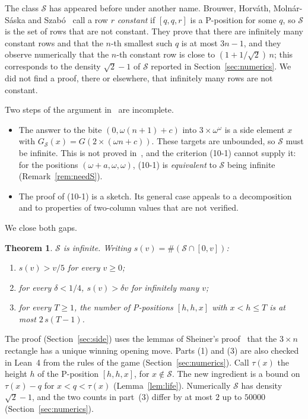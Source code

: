\documentclass[11pt]{amsart}
\newtheorem{theorem}{Theorem}
\theoremstyle{definition}
\theoremstyle{remark}
\newcommand{\Sc}{\mathcal{S}}
\newcommand{\G}{G}
\newcommand{\GS}{G_{\Sc}}
\begin{document}
The class $\Sc$ has appeared before under another name. Brouwer, Horv\'ath, Moln\'ar-S\'aska
and Szab\'o~\cite[\S8.5--8.8]{BHMS} call a row $r$ \emph{constant} if $[q,q,r]$ is a P-position
for some $q$, so $\Sc$ is the set of rows that are not constant. They prove that there are
infinitely many constant rows and that the $n$-th smallest such $q$ is at most $3n-1$, and
they observe numerically that the $n$-th constant row is close to $(1+1/\sqrt2)\,n$; this
corresponds to the density $\sqrt2-1$ of $\Sc$ reported in Section~\ref{sec:numerics}. We did
not find a proof, there or elsewhere, that infinitely many rows are not constant.

Two steps of the argument in~\cite{HS} are incomplete.
\begin{itemize}
\item The answer to the bite $(0,\omega(n+1)+c)$ into $3\times\omega^\omega$ is a side element
  $x$ with $\GS(x)=\G(2\times(\omega n+c))$. These targets are unbounded, so $\Sc$ must be
  infinite. This is not proved in~\cite{HS}, and the criterion (10-1) cannot supply it: for the
  positions $(\omega+a,\omega,\omega)$, (10-1) is \emph{equivalent} to $\Sc$ being infinite
  (Remark~\ref{rem:needS}).
\item The proof of (10-1) is a sketch. Its general case appeals to a decomposition and to
  properties of two-column values that are not verified.
\end{itemize}

We close both gaps.

\begin{theorem}\label{thm:side}
$\Sc$ is infinite. Writing $s(v)=\#(\Sc\cap[0,v])$:
\begin{enumerate}
\item $s(v)>v/5$ for every $v\ge0$;
\item for every $\delta<1/4$, $s(v)>\delta v$ for infinitely many $v$;
\item for every $T\ge1$, the number of P-positions $[h,h,x]$ with $x<h\le T$ is at most
  $2\,s(T-1)$.
\end{enumerate}
\end{theorem}

The proof (Section~\ref{sec:side}) uses the lemmas of Sheiner's proof~\cite{Sh} that the
$3\times n$ rectangle has a unique winning opening move. Parts (1) and (3) are also checked in
Lean~4 from the rules of the game (Section~\ref{sec:numerics}). Call $\tau(x)$ the height $h$ of the
P-position $[h,h,x]$, for $x\notin\Sc$. The new ingredient is a bound on $\tau(x)-q$ for
$x<q<\tau(x)$ (Lemma~\ref{lem:life}). Numerically $\Sc$ has density $\sqrt2-1$, and the two
counts in part~(3) differ by at most $2$ up to $50000$ (Section~\ref{sec:numerics}).
\end{document}
